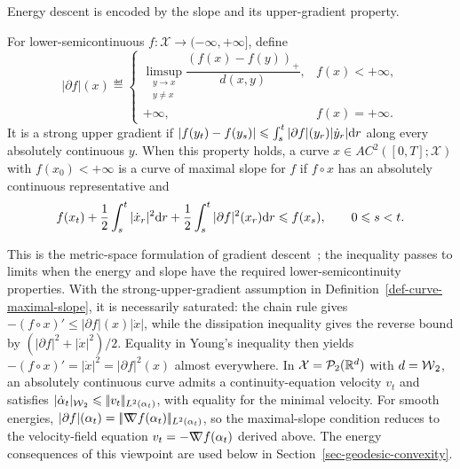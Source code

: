 Energy descent is encoded by the slope and its upper-gradient property.
\begin{defn}\label{def-curve-maximal-slope}
For lower-semicontinuous $f:\mathcal X\to(-\infty,+\infty]$, define
		\[
		|\partial f|(x)
		\eqdef
		\begin{cases}
		\limsup_{\substack{y\to x\\ y\neq x}}
			\dfrac{( f(x)-f(y) )_+}{d(x,y)}, & f(x)<+\infty,\\[.4em]
		+\infty, & f(x)=+\infty.
		\end{cases}
		\]
It is a strong upper gradient if $|f(y_t)-f(y_s)|\leqslant \int_s^t |\partial f|(y_r)|\dot y_r|\mathrm{d} r$ along every absolutely continuous $y$. When this property holds, a curve $x\in AC^2([0,T];\mathcal X)$ with $f(x_0)<+\infty$ is a curve of maximal slope for $f$ if $f\circ x$ has an absolutely continuous representative and
	\[
		f(x_t)
		+\frac12\int_s^t |\dot x_r|^2\mathrm{d} r
		+\frac12\int_s^t |\partial f|^2(x_r)\mathrm{d} r
		\leqslant f(x_s),
			\qquad 0\leqslant s<t.
		\]
\end{defn}
This is the metric-space formulation of gradient descent~\citep{ambrosio2006gradient}; the inequality passes to limits when the energy and slope have the required lower-semicontinuity properties. With the strong-upper-gradient assumption in Definition~\ref{def-curve-maximal-slope}, it is necessarily saturated: the chain rule gives $-(f\circ x)'\leq |\partial f|(x)|\dot x|$, while the dissipation inequality gives the reverse bound by $(|\partial f|^2+|\dot x|^2)/2$. Equality in Young's inequality then yields $-(f\circ x)'=|\dot x|^2=|\partial f|^2(x)$ almost everywhere. In $\mathcal X=\mathcal{P}_2(\mathbb{R}^d)$ with $d=\operatorname{\mathcal{W}}_2$, an absolutely continuous curve admits a continuity-equation velocity $v_t$ and satisfies $|\dot\alpha_t|_{\operatorname{\mathcal{W}}_2}\leqslant|\!| v_t |\!|_{L^2(\alpha_t)}$, with equality for the minimal velocity. For smooth energies, $|\partial f|(\alpha_t)=|\!| \mathord{\nabla\mkern-9.3mu\nabla} f(\alpha_t) |\!|_{L^2(\alpha_t)}$, so the maximal-slope condition reduces to the velocity-field equation $v_t=-\mathord{\nabla\mkern-9.3mu\nabla} f(\alpha_t)$ derived above. The energy consequences of this viewpoint are used below in Section~\ref{sec-geodesic-convexity}.

